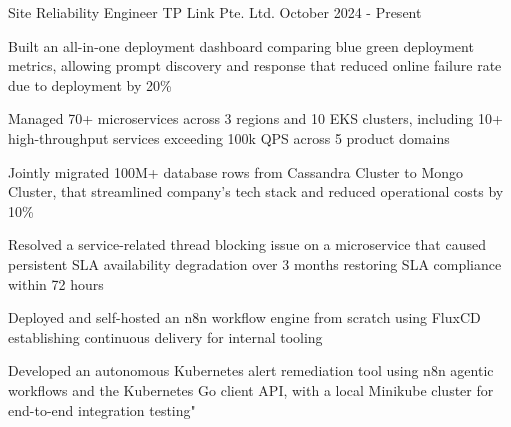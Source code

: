 

\begin{cventries}

  \cventry
  {Site Reliability Engineer} %
  {TP Link Pte. Ltd.} %
  {} %
  {October 2024 - Present} %
  {
    \begin{cvitems} %
      \item {Built an all-in-one deployment dashboard comparing blue green deployment metrics, allowing prompt discovery and response that reduced online failure rate due to deployment by 20\%}
      \item {Managed 70+ microservices across 3 regions and 10 EKS clusters, including 10+ high-throughput services exceeding 100k QPS across 5 product domains}
      \item {Jointly migrated 100M+ database rows from Cassandra Cluster to Mongo Cluster, that streamlined company's tech stack and reduced operational costs by 10\%}
      \item {Resolved a service-related thread blocking issue on a microservice that caused persistent SLA availability degradation over 3 months restoring SLA compliance within 72 hours}
      \item {Deployed and self-hosted an n8n workflow engine from scratch using FluxCD establishing continuous delivery for internal tooling}
      \item {Developed an autonomous Kubernetes alert remediation tool using n8n agentic workflows and the Kubernetes Go client API, with a local Minikube cluster for end-to-end integration testing"}
    \end{cvitems}
    \vspace{4mm}
  }


\end{cventries}
